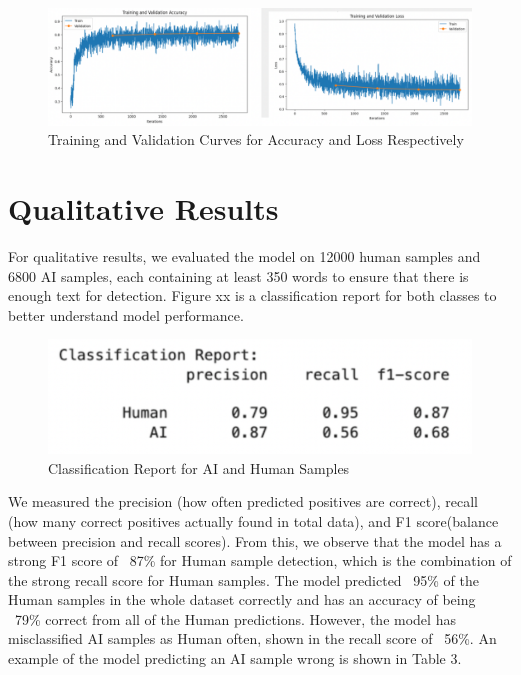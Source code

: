 \documentclass{article} %
\begin{document}
\begin{figure}[htbp]
    \centering
    \includegraphics[width=0.9\linewidth]{trainValcurve.png}
    \caption{Training and Validation Curves for Accuracy and Loss Respectively} 
    \label{fig:pipeline}
\end{figure}




\section{Qualitative Results}
For qualitative results, we evaluated the model on 12000 human samples and 6800 AI samples, each containing at least 350 words to ensure that there is enough text for detection. Figure xx is a classification report for both classes to better understand model performance.

\begin{figure}[htbp]
    \centering
    \includegraphics[width=0.9\linewidth]{classReport.png}
    \caption{Classification Report for AI and Human Samples} 
    \label{fig:pipeline}
\end{figure}

We measured the precision (how often predicted positives are correct), recall (how many correct positives actually found in total data), and F1 score(balance between precision and recall scores). From this, we observe that the model has a strong F1 score of ~87\% for Human sample detection, which is the combination of the strong recall score for Human samples. The model predicted ~95\% of the Human samples in the whole dataset correctly and has an accuracy of being ~79\% correct from all of the Human predictions. However, the model has misclassified AI samples as Human often, shown in the recall score of ~56\%. An example of the model predicting an AI sample wrong is shown in Table 3.
\end{document}
